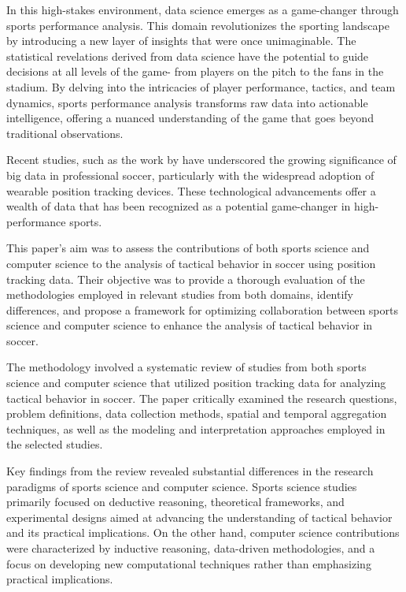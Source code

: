 \documentclass[12pt]{article}
\begin{document}
In this high-stakes environment, data science emerges as a game-changer through
sports performance analysis. This domain revolutionizes the sporting landscape
by introducing a new layer of insights that were once unimaginable. The
statistical revelations derived from data science have the potential to guide
decisions at all levels of the game- from players on the pitch to the fans in
the stadium. By delving into the intricacies of player performance, tactics, and
team dynamics, sports performance analysis transforms raw data into actionable
intelligence, offering a nuanced understanding of the game that goes beyond
traditional observations.


Recent studies, such as the work by \citet{goes2021unlocking} have underscored
the growing significance of big data in professional soccer, particularly with
the widespread adoption of wearable position tracking devices. These technological
advancements offer a wealth of data that has been recognized as a potential
game-changer in high-performance sports. 

This paper's aim was to assess the contributions of both sports science and
computer science to the analysis of tactical behavior in soccer using position
tracking data. Their objective was to provide a thorough evaluation of the
methodologies employed in relevant studies from both domains, identify
differences, and propose a framework for optimizing collaboration between sports
science and computer science to enhance the analysis of tactical behavior in soccer.

The methodology involved a systematic review of studies from both sports science
and computer science that utilized position tracking data for analyzing tactical
behavior in soccer. The paper critically examined the research questions,
problem definitions, data collection methods, spatial and temporal aggregation
techniques, as well as the modeling and interpretation approaches employed in the
selected studies.

Key findings from the review revealed substantial differences in the research
paradigms of sports science and computer science. Sports science studies primarily
focused on deductive reasoning, theoretical frameworks, and experimental designs
aimed at advancing the understanding of tactical behavior and its practical
implications. On the other hand, computer science contributions were characterized
by inductive reasoning, data-driven methodologies, and a focus on developing new
computational techniques rather than emphasizing practical implications.
\end{document}
